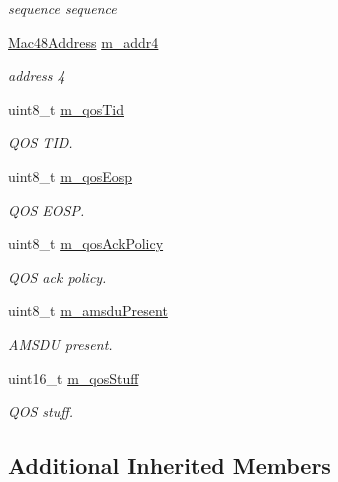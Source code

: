 \begin{DoxyCompactItemize}
\begin{DoxyCompactList}\small\item\em sequence sequence \end{DoxyCompactList}\item 
\hyperlink{classns3_1_1Mac48Address}{Mac48\+Address} \hyperlink{classns3_1_1WifiMacHeader_a6402854379cded51f69ca2738ef50e70}{m\+\_\+addr4}
\begin{DoxyCompactList}\small\item\em address 4 \end{DoxyCompactList}\item 
uint8\+\_\+t \hyperlink{classns3_1_1WifiMacHeader_a08f5caad43fd89a6dffc840c6ed82d40}{m\+\_\+qos\+Tid}
\begin{DoxyCompactList}\small\item\em Q\+OS T\+ID. \end{DoxyCompactList}\item 
uint8\+\_\+t \hyperlink{classns3_1_1WifiMacHeader_a05f7f1f21fdb154ae379532b09cece0d}{m\+\_\+qos\+Eosp}
\begin{DoxyCompactList}\small\item\em Q\+OS E\+O\+SP. \end{DoxyCompactList}\item 
uint8\+\_\+t \hyperlink{classns3_1_1WifiMacHeader_afe3899401c9a7f154ffb8a210b94e3e2}{m\+\_\+qos\+Ack\+Policy}
\begin{DoxyCompactList}\small\item\em Q\+OS ack policy. \end{DoxyCompactList}\item 
uint8\+\_\+t \hyperlink{classns3_1_1WifiMacHeader_a577aec92d6bff48d9fb98a927f410aef}{m\+\_\+amsdu\+Present}
\begin{DoxyCompactList}\small\item\em A\+M\+S\+DU present. \end{DoxyCompactList}\item 
uint16\+\_\+t \hyperlink{classns3_1_1WifiMacHeader_aad74ef79def1a6968dbef1eb80842d33}{m\+\_\+qos\+Stuff}
\begin{DoxyCompactList}\small\item\em Q\+OS stuff. \end{DoxyCompactList}\end{DoxyCompactItemize}
\subsection*{Additional Inherited Members}


